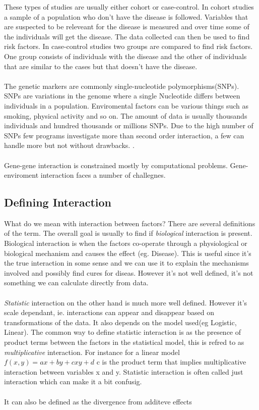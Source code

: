 \documentclass[10pt,a4paper]{article}
\begin{document}
These types of studies are usually either cohort or case-control. In cohort studies a sample of a population who don't have the disease is followed. Variables that are suspected to be releveant for the disease is measured and over time some of the individuals will get the disease. The data collected can then be used to find risk factors. In case-control studies two groups are compared to find risk factors. One group consists of individuals with the disease and the other of individuals that are similar to the cases but that doesn't have the disease. \cite{rothman1998modern,mann_observational}\\
\\
The genetic markers are commonly single-nucleotide polymorphisms(SNPs). SNPs are variations in the genome where a single Nucleotide differs between individuals in a population\cite{fareed_snp}. Enviromental factors can be various things such as smoking, physical activity and so on. The amount of data is usually thousands individuals and hundred thousands or millions SNPs. Due to the high number of SNPs few programs investigate more than second order interaction, a few can handle more but not without drawbacks. \cite{gwis,high_order_2012,fast_high_order_cluster}.\\
\\
Gene-gene interaction is constrained mostly by computational problems\cite{cordell_detect_review}. Gene-enviroment interaction faces a number of challegnes.




\subsection{Defining Interaction}
What do we mean with interaction between factors? There are several definitions of the term\cite{rothman2002intro_epidemiology}. The overall goal is usually to find if \emph{biological} interaction is present. Biological interaction is when the factors co-operate through a physiological or biological mechanism and causes the effect (eg. Disease). This is useful since it's the true interaction in some sense and we can use it to explain the mechanisms involved and possibly find cures for diseas. However it's not well defined, it's not something we can calculate directly from data.\cite{rothman1998modern,rothman2002intro_epidemiology}\\
\\
\emph{Statistic} interaction on the other hand is much more well defined. However it's scale dependant, ie. interactions can appear and disappear based on transformations of the data. It also depends on the model used(eg Logistic, Linear). The common way to define statistic interaction is as the presence of product terms between the factors in the statistical model, this is refred to as \emph{multiplicative} interaction. For instance for a linear model $f(x,y)=ax+by+cxy+d$ c is the product term that implies multiplicative interaction between variables x and y. Statistic interaction is often called just interaction which can make it a  bit confusig.\cite{geira,rothman1998modern}\\
\\
It can also be defined as the divergence from additeve effects
\end{document}
